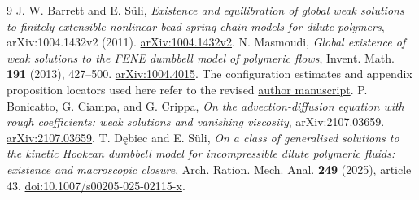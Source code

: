 \documentclass[11pt]{article}
\numberwithin{equation}{section}
\begin{document}
\begin{thebibliography}{9}
 J. W. Barrett and E. S\"uli,
\emph{Existence and equilibration of global weak solutions to finitely
extensible nonlinear bead-spring chain models for dilute polymers},
arXiv:1004.1432v2 (2011).
\href{https://arxiv.org/abs/1004.1432v2}{arXiv:1004.1432v2}.
 N. Masmoudi,
\emph{Global existence of weak solutions to the FENE dumbbell model of
polymeric flows}, Invent. Math. \textbf{191} (2013), 427--500.
\href{https://arxiv.org/abs/1004.4015}{arXiv:1004.4015}.
The configuration estimates and appendix proposition locators used here refer
to the revised \href{https://math.nyu.edu/~masmoudi/Fene-global.pdf}{author manuscript}.
 P. Bonicatto, G. Ciampa, and G. Crippa,
\emph{On the advection-diffusion equation with rough coefficients:
weak solutions and vanishing viscosity}, arXiv:2107.03659.
\href{https://arxiv.org/abs/2107.03659}{arXiv:2107.03659}.
 T. D\k{e}biec and E. S\"uli,
\emph{On a class of generalised solutions to the kinetic Hookean dumbbell
model for incompressible dilute polymeric fluids: existence and macroscopic
closure}, Arch. Ration. Mech. Anal. \textbf{249} (2025), article 43.
\href{https://doi.org/10.1007/s00205-025-02115-x}{doi:10.1007/s00205-025-02115-x}.
\end{thebibliography}
\end{document}
